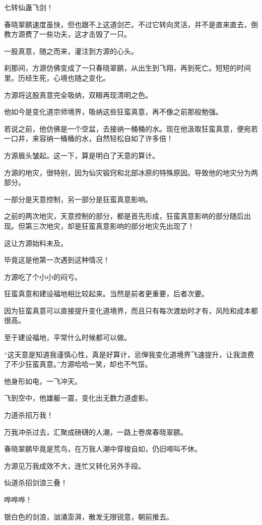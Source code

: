 \begin{this_body}
七转仙蛊飞剑！

春晓翠鹂速度虽快，但也跟不上这道剑芒。不过它转向灵活，并不是直来直去，倒教方源费了一些功夫，这才击毁了一只。

一股真意，随之而来，灌注到方源的心头。

刹那间，方源仿佛变成了一只春晓翠鹂，从出生到飞翔，再到死亡。短短的时间里。历经生死，心境也随之变化。

方源将这股真意完全吸纳，双眼再现清明之色。

他如今是变化道宗师境界，吸纳这些狂蛮真意，再不像之前那般勉强。

若说之前，他仿佛是一个空盆，去接纳一桶桶的水。现在他汲取狂蛮真意，便宛若一口井，来容纳一桶桶的水，自然轻松自如了许多倍！

方源眉头皱起。这一下，算是明白了天意的算计。

方源的地灾，很特别，因为仙灾锻窍和北部冰原的特殊原因。导致他的地灾分为两部分。

一部分是天意控制，另一部分是狂蛮真意影响。

之前的两次地灾，天意控制的部分，都是首先形成，狂蛮真意影响的部分随后出现。但第三次地灾，却是狂蛮真意影响的部分地灾先出现了！

这让方源始料未及。

毕竟这是他第一次遇到这种情况！

方源吃了个小小的闷亏。

狂蛮真意和建设福地相比较起来。当然是前者更重要，后者次要。

因为狂蛮真意可以直接提升变化道境界，而且只有每次渡劫时才有，风险和成本都很高。

至于建设福地，平常什么时候都可以做。

“这天意是知道我谨慎心性，真是好算计，忌惮我变化道境界飞速提升，让我浪费了不少狂蛮真意。”方源哈哈一笑，却也不气馁。

他身形如电，一飞冲天。

飞到空中，他雄躯一震，变化出无数力道虚影。

力道杀招万我！

万我冲杀过去，汇聚成磅礴的人潮，一路上卷席春晓翠鹂。

春晓翠鹂毕竟是荒鸟，在万我人潮中穿梭自如，仍旧啼叫不休。

方源见万我成效不大，连忙又转化另外手段。

仙道杀招剑浪三叠！

哗哗哗！

银白色的剑浪，汹涌澎湃，散发无限锐意，朝前推去。


\end{this_body}
